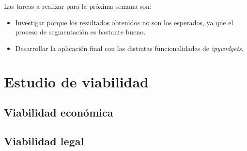 Las tareas a realizar para la próxima semana son:
\begin{itemize}
    \item Investigar porque los resultados obtenidos no son los esperados, ya que el proceso de segmentación es bastante bueno.
    \item Desarrollar la aplicación final con las distintas funcionalidades de \emph{ipywidgets}.
\end{itemize}
\section{Estudio de viabilidad}

\subsection{Viabilidad económica}

\subsection{Viabilidad legal}


